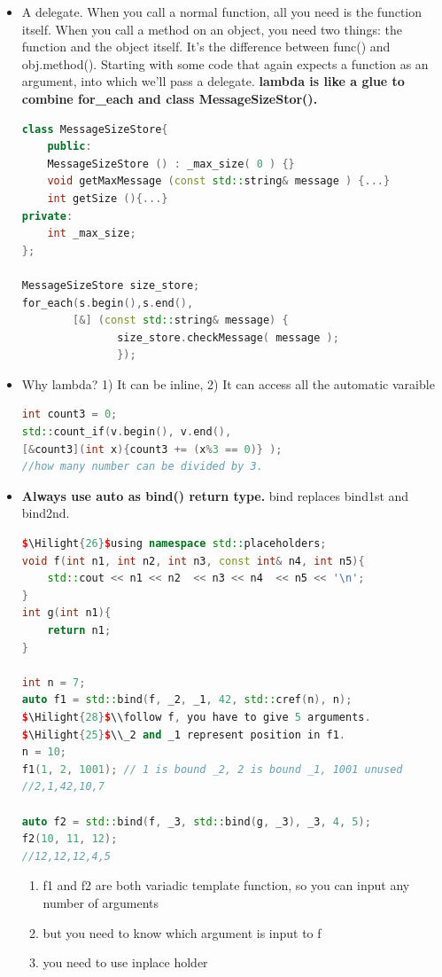 \documentclass[a4paper,12pt,twoside]{book}
\newcommand{\Hilight}[1]{\makebox[0pt][l]{\color{yellow}\rule[-3pt]{#1em}{11pt}}}
\begin{document}
\begin{itemize}
\item A delegate. When you call a normal function, all you need is the function itself. When you call a method on an object, you need two things: the function and the object itself. It's the difference between func() and obj.method(). Starting with some code that again expects a function as an argument, into which we'll pass a delegate. \textbf{lambda is like a glue to combine for\_each and class MessageSizeStor().}

\begin{lstlisting}[frame=single, language=c++]
class MessageSizeStore{
    public:
    MessageSizeStore () : _max_size( 0 ) {}
    void getMaxMessage (const std::string& message ) {...}
    int getSize (){...}
private:
    int _max_size;
};

MessageSizeStore size_store;
for_each(s.begin(),s.end(),
        [&] (const std::string& message) {
               size_store.checkMessage( message );
               });
\end{lstlisting}


\item Why lambda? 1) It can be inline, 2) It can access all the automatic varaible
\begin{lstlisting}[frame=single, language=c++]
int count3 = 0;
std::count_if(v.begin(), v.end(),
[&count3](int x){count3 += (x%3 == 0)} );
//how many number can be divided by 3.
\end{lstlisting}


\item \textbf{Always use auto as bind() return type. } bind replaces bind1st and bind2nd.

\begin{lstlisting}[frame=single, language=c++, mathescape=true]
$\Hilight{26}$using namespace std::placeholders;
void f(int n1, int n2, int n3, const int& n4, int n5){
    std::cout << n1 << n2  << n3 << n4  << n5 << '\n';
}
int g(int n1){
    return n1;
}

int n = 7;
auto f1 = std::bind(f, _2, _1, 42, std::cref(n), n);
$\Hilight{28}$\\follow f, you have to give 5 arguments.
$\Hilight{25}$\\_2 and _1 represent position in f1.
n = 10;
f1(1, 2, 1001); // 1 is bound _2, 2 is bound _1, 1001 unused
//2,1,42,10,7

auto f2 = std::bind(f, _3, std::bind(g, _3), _3, 4, 5);
f2(10, 11, 12);
//12,12,12,4,5
\end{lstlisting}
\begin{enumerate}
\item f1 and f2 are both variadic template function, so you can input any number of arguments
\item but you need to know which argument is input to f
\item you need to use inplace holder
\end{enumerate}


\end{itemize}
\end{document}

